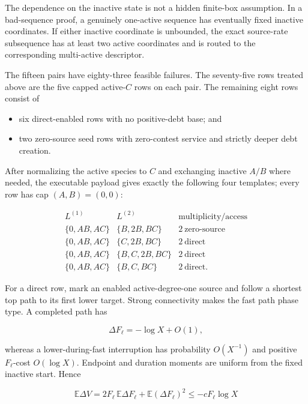 The dependence on the inactive state is not a hidden finite-box
assumption. In a bad-sequence proof, a genuinely one-active sequence has
eventually fixed inactive coordinates. If either inactive coordinate is
unbounded, the exact source-rate subsequence has at least two active
coordinates and is routed to the corresponding multi-active descriptor.

The fifteen pairs have eighty-three feasible failures. The seventy-five
rows treated above are the five capped active-\(C\) rows on each pair.
The remaining eight rows consist of

\begin{itemize}
\tightlist
\item
  six direct-enabled rows with no positive-debt base; and
\item
  two zero-source seed rows with zero-contest service and strictly
  deeper debt creation.
\end{itemize}

After normalizing the active species to \(C\) and exchanging inactive
\(A/B\) where needed, the executable payload gives exactly the following
four templates; every row has cap \((A,B)=(0,0)\):

\[
\begin{array}{c|c|c}
L^{(1)}&L^{(2)}&\text{multiplicity/access}\\ \hline
\{0,AB,AC\}&\{B,2B,BC\}&2\ \text{zero-source}\\
\{0,AB,AC\}&\{C,2B,BC\}&2\ \text{direct}\\
\{0,AB,AC\}&\{B,C,2B,BC\}&2\ \text{direct}\\
\{0,AB,AC\}&\{B,C,BC\}&2\ \text{direct}.
\end{array}                                           \tag{7.4a}
\]

For a direct row, mark an enabled active-degree-one source and follow a
shortest top path to its first lower target. Strong connectivity makes
the fast path phase type. A completed path has

\[
 \Delta F_\ell=-\log X+O(1),                         \tag{7.4}
\]

whereas a lower-during-fast interruption has probability \(O(X^{-1})\)
and positive \(F_\ell\)-cost \(O(\log X)\). Endpoint and duration
moments are uniform from the fixed inactive start. Hence

\[
 \mathbb E\Delta V
 =2F_\ell\,\mathbb E\Delta F_\ell
   +\mathbb E(\Delta F_\ell)^2
 \leq-cF_\ell\log X                                  \tag{7.5}
\]

